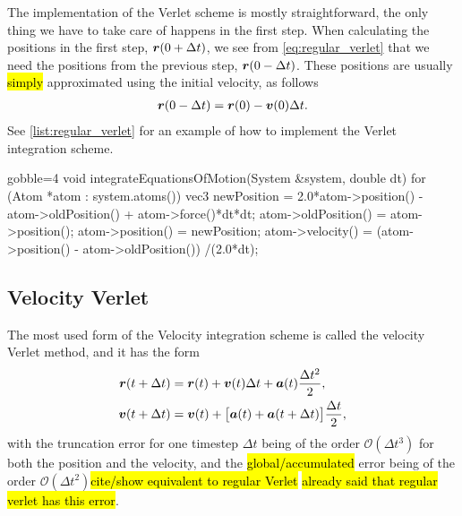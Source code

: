 The implementation of the Verlet scheme is mostly straightforward, the only thing we have to take care of happens in the first step. When calculating the positions in the first step, $\boldsymbol{r}(0+\Delta t)$, we see from \cref{eq:regular_verlet} that we need the positions from the previous step, $\boldsymbol{r}(0-\Delta t)$. These positions are usually \hl{simply} approximated using the initial velocity, as follows
\begin{align*}
    \boldsymbol{r}(0-\Delta t) = \boldsymbol{r}(0) - \boldsymbol{v}(0)\Delta t.
\end{align*}
See \cref{list:regular_verlet} for an example of how to implement the Verlet integration scheme.
%
\begin{listing}[!htb]%
\begin{cppcode*}{gobble=4}
    void integrateEquationsOfMotion(System &system, double dt) {
        for (Atom *atom : system.atoms()) {
            vec3 newPosition = 2.0*atom->position() - atom->oldPosition() 
                               + atom->force()*dt*dt;
            atom->oldPosition() = atom->position();
            atom->position() = newPosition;
            atom->velocity() = (atom->position() - atom->oldPosition())
                               /(2.0*dt);
        }
    }
\end{cppcode*}
\caption{%
    Implentation of  from \cref{list:simple_md_program}.%
    \label{list:regular_verlet}%
}%
\end{listing}%

\subsection{Velocity Verlet}
The most used form of the Velocity integration scheme is called the velocity Verlet method\cite{swope1982computer}, and it has the form
\begin{align}
    \boldsymbol{r}(t + \Delta t) &= \boldsymbol{r}(t) + \boldsymbol{v}(t)\Delta t + \boldsymbol{a}(t)\frac{\Delta t^2}{2}, \label{eq:velocity_verlet_position}\\
    \boldsymbol{v}(t + \Delta t) &= \boldsymbol{v}(t) + \big[\boldsymbol{a}(t) + \boldsymbol{a}(t + \Delta t)\big] \frac{\Delta t}{2}, \label{eq:velocity_verlet_velocity}
\end{align}
with the truncation error for one timestep $\Delta t$ being of the order $\mathcal{O}(\Delta t^3)$ for both the position and the velocity, and the \hl{global/accumulated} error being of the order $\mathcal{O}(\Delta t^2)$\hl{cite/show equivalent to regular Verlet} \hl{already said that regular verlet has this error}. 

